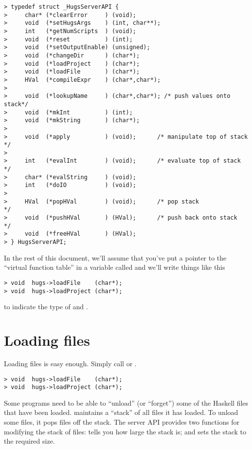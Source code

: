 \begin{verbatim}
> typedef struct _HugsServerAPI {
>     char* (*clearError     ) (void);
>     void  (*setHugsArgs    ) (int, char**);
>     int   (*getNumScripts  ) (void);
>     void  (*reset          ) (int);
>     void  (*setOutputEnable) (unsigned);
>     void  (*changeDir      ) (char*);
>     void  (*loadProject    ) (char*);
>     void  (*loadFile       ) (char*);
>     HVal  (*compileExpr    ) (char*,char*);
> 			       
>     void  (*lookupName     ) (char*,char*); /* push values onto stack*/
>     void  (*mkInt          ) (int);
>     void  (*mkString       ) (char*);
> 			       
>     void  (*apply          ) (void);      /* manipulate top of stack */
> 			       
>     int   (*evalInt        ) (void);      /* evaluate top of stack   */
>     char* (*evalString     ) (void);
>     int   (*doIO           ) (void);
> 			       
>     HVal  (*popHVal        ) (void);      /* pop stack               */
>     void  (*pushHVal       ) (HVal);      /* push back onto stack    */
>     void  (*freeHVal       ) (HVal); 
> } HugsServerAPI;
\end{verbatim}

In the rest of this document, we'll assume that you've put a pointer
to the ``virtual function table'' in a variable called  and
we'll write things like this

\begin{verbatim}
> void  hugs->loadFile    (char*);
> void  hugs->loadProject (char*);
\end{verbatim}

to indicate the type of  and .

\section{Loading files}\label{loading files}

Loading files is easy enough.  Simply call
 or .

\begin{verbatim}
> void  hugs->loadFile    (char*);
> void  hugs->loadProject (char*);
\end{verbatim}

Some programs need to be able to ``unload'' (or ``forget'') some of
the Haskell files that have been loaded.  \Hugs{} maintains a
``stack'' of all files it has loaded.  To unload some files, it pops
files off the stack.  The server API provides two functions for
modifying the stack of files:  tells you how large
the stack is; and  sets the stack to the required size.

